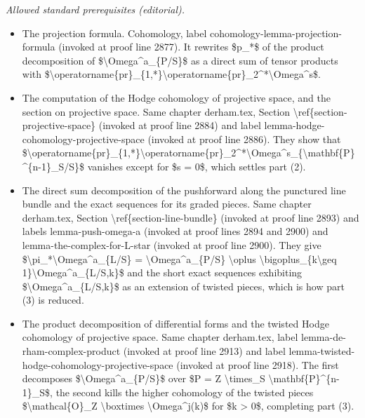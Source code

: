 \documentclass[10pt,a4paper]{amsart}
\theoremstyle{plain}
\theoremstyle{definition}
\theoremstyle{remark}
\numberwithin{equation}{subsection}
\begin{document}
\noindent\textit{Allowed standard prerequisites (editorial).}\begin{itemize}
\item The projection formula. Cohomology, label cohomology-lemma-projection-formula (invoked at proof line 2877). It rewrites \$p\_*\$ of the product decomposition of \$\textbackslash{}Omega\textasciicircum{}a\_\{P/S\}\$ as a direct sum of tensor products with \$\textbackslash{}operatorname\{pr\}\_\{1,*\}\textbackslash{}operatorname\{pr\}\_2\textasciicircum{}*\textbackslash{}Omega\textasciicircum{}s\$.
\item The computation of the Hodge cohomology of projective space, and the section on projective space. Same chapter derham.tex, Section \textbackslash{}ref\{section-projective-space\} (invoked at proof line 2884) and label lemma-hodge-cohomology-projective-space (invoked at proof line 2886). They show that \$\textbackslash{}operatorname\{pr\}\_\{1,*\}\textbackslash{}operatorname\{pr\}\_2\textasciicircum{}*\textbackslash{}Omega\textasciicircum{}s\_\{\textbackslash{}mathbf\{P\}\textasciicircum{}\{n-1\}\_S/S\}\$ vanishes except for \$s = 0\$, which settles part (2).
\item The direct sum decomposition of the pushforward along the punctured line bundle and the exact sequences for its graded pieces. Same chapter derham.tex, Section \textbackslash{}ref\{section-line-bundle\} (invoked at proof line 2893) and labels lemma-push-omega-a (invoked at proof lines 2894 and 2900) and lemma-the-complex-for-L-star (invoked at proof line 2900). They give \$\textbackslash{}pi\_*\textbackslash{}Omega\textasciicircum{}a\_\{L/S\} = \textbackslash{}Omega\textasciicircum{}a\_\{P/S\} \textbackslash{}oplus \textbackslash{}bigoplus\_\{k\textbackslash{}geq 1\}\textbackslash{}Omega\textasciicircum{}a\_\{L/S,k\}\$ and the short exact sequences exhibiting \$\textbackslash{}Omega\textasciicircum{}a\_\{L/S,k\}\$ as an extension of twisted pieces, which is how part (3) is reduced.
\item The product decomposition of differential forms and the twisted Hodge cohomology of projective space. Same chapter derham.tex, label lemma-de-rham-complex-product (invoked at proof line 2913) and label lemma-twisted-hodge-cohomology-projective-space (invoked at proof line 2918). The first decomposes \$\textbackslash{}Omega\textasciicircum{}a\_\{P/S\}\$ over \$P = Z \textbackslash{}times\_S \textbackslash{}mathbf\{P\}\textasciicircum{}\{n-1\}\_S\$, the second kills the higher cohomology of the twisted pieces \$\textbackslash{}mathcal\{O\}\_Z \textbackslash{}boxtimes \textbackslash{}Omega\textasciicircum{}j(k)\$ for \$k > 0\$, completing part (3).
\end{itemize}\medskip
\end{document}
